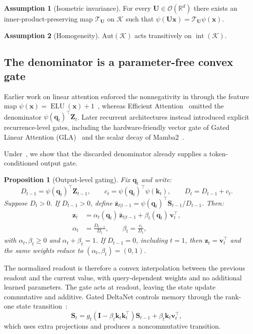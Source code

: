 \documentclass{article}
\newcommand{\1}{\bm{1}}
\def\vk{{\bm{k}}}
\def\vq{{\bm{q}}}
\def\vv{{\bm{v}}}
\def\vx{{\bm{x}}}
\def\vz{{\bm{z}}}
\def\mI{{\bm{I}}}
\def\mS{{\bm{S}}}
\def\mU{{\bm{U}}}
\def\mZ{{\bm{Z}}}
\def\gK{{\mathcal{K}}}
\def\gO{{\mathcal{O}}}
\def\gT{{\mathcal{T}}}
\newcommand{\R}{\mathbb{R}}
\newtheorem{proposition}[theorem]{Proposition}
\theoremstyle{definition}
\newtheorem{assumption}{Assumption}
\begin{document}
\begin{assumption}[Isometric invariance]
  \label{ass:iso}
  For every $\mU\in\gO(\R^d)$ there exists an inner-product-preserving map $\gT_\mU$ on $\gK$ such
  that $\psi(\mU\vx)=\gT_\mU\psi(\vx)$.
\end{assumption}

\begin{assumption}[Homogeneity]
  \label{ass:homogene}
  $\mathrm{Aut}(\gK)$ acts transitively on $\operatorname{int}(\gK)$.
\end{assumption}

\subsection{The denominator is a parameter-free convex gate}

Earlier work on linear attention enforced the nonnegativity in  through the feature
map $\psi(\vx)=\operatorname{ELU}(\vx)+1$~\citep{katharopoulos20transformers}, whereas Efficient
Attention~\citep{shen21efficient} omitted the denominator $\psi(\vq_t)^\top\mZ_t$. Later recurrent
architectures instead introduced explicit recurrence-level gates, including the hardware-friendly
vector gate of Gated Linear Attention (GLA)~\citep{yang24gla} and the scalar decay of
Mamba2~\citep{dao24mamba2}.

Under~, we show that the discarded denominator already supplies a token-conditioned
output gate.
\begin{proposition}[Output-level gating]
  \label{prop:output-gate}
  Fix $\vq_t$ and write:
  \[
    D_{t-1}=\psi(\vq_t)^\top\mZ_{t-1},
    \qquad
    c_t=\psi(\vq_t)^\top\psi(\vk_t),
    \qquad
    D_t=D_{t-1}+c_t.
  \]
  Suppose $D_t>0$. If $D_{t-1}>0$, define
  $\bar\vz_{t|t-1}=\psi(\vq_t)^\top\mS_{t-1}/D_{t-1}$. Then:
  \begin{align}
    \vz_t
      &=\alpha_t(\vq_t)\,\bar\vz_{t|t-1}
        +\beta_t(\vq_t)\,\vv_t^\top, \\
    \alpha_t
      &=\frac{D_{t-1}}{D_t},
    \qquad
    \beta_t
      =\frac{c_t}{D_t},
    \label{eq:output-gate}
  \end{align}
  with $\alpha_t,\beta_t\ge0$ and $\alpha_t+\beta_t=1$. If $D_{t-1}=0$, including
  $t=1$, then $\vz_t=\vv_t^\top$ and the same weights reduce to
  $(\alpha_t,\beta_t)=(0,1)$.
\end{proposition}
The normalized readout is therefore a convex interpolation between the previous readout and the
current value, with query-dependent weights and no additional learned parameters. The gate acts at
readout, leaving the state update commutative and additive. Gated DeltaNet controls memory through
the rank-one state transition~\citep{yang25gateddeltanet}:
\[
  \mS_t
  =g_t(\mI-\beta_t\vk_t\vk_t^\top)\mS_{t-1}
   +\beta_t\vk_t\vv_t^\top,
\]
which uses extra projections and produces a noncommutative transition.
\end{document}
